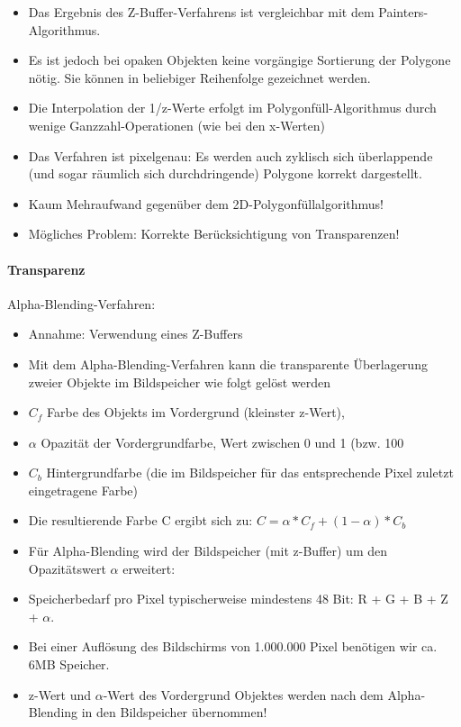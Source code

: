\documentclass[10pt,landscape]{article}
\begin{document}
\begin{multicols}{3}
{  %
  
  \begin{itemize}
    \item Das Ergebnis des Z-Buffer-Verfahrens ist vergleichbar mit dem Painters-Algorithmus.
    \item Es ist jedoch bei opaken Objekten keine vorgängige Sortierung der Polygone nötig. Sie können in beliebiger Reihenfolge gezeichnet werden.
    \item Die Interpolation der 1/z-Werte erfolgt im Polygonfüll-Algorithmus durch wenige Ganzzahl-Operationen (wie bei den x-Werten)
    \item Das Verfahren ist pixelgenau: Es werden auch zyklisch sich überlappende (und sogar räumlich sich durchdringende) Polygone korrekt dargestellt.
    \item Kaum Mehraufwand gegenüber dem 2D-Polygonfüllalgorithmus!
    \item Mögliches Problem: Korrekte Berücksichtigung von Transparenzen!
  \end{itemize}
  
  \paragraph{Transparenz}
  Alpha-Blending-Verfahren: 
  \begin{itemize}
    \item Annahme: Verwendung eines Z-Buffers
    \item Mit dem Alpha-Blending-Verfahren kann die transparente Überlagerung zweier Objekte im Bildspeicher wie folgt gelöst werden
    \item $C_f$ Farbe des Objekts im Vordergrund (kleinster z-Wert),
    \item $\alpha$ Opazität der Vordergrundfarbe, Wert zwischen 0 und 1 (bzw. 100%
    \item $C_b$ Hintergrundfarbe (die im Bildspeicher für das entsprechende Pixel zuletzt eingetragene Farbe)
    \item Die resultierende Farbe C ergibt sich zu: $C=\alpha*C_f+(1-\alpha)*C_b$
    \item Für Alpha-Blending wird der Bildspeicher (mit z-Buffer) um den Opazitätswert $\alpha$ erweitert:
    \item Speicherbedarf pro Pixel typischerweise mindestens 48 Bit: R + G + B + Z + $\alpha$.
    \item Bei einer Auflösung des Bildschirms von 1.000.000 Pixel benötigen wir ca. 6MB Speicher.
    \item z-Wert und $\alpha$-Wert des Vordergrund Objektes werden nach dem Alpha-Blending in den Bildspeicher übernommen!
  \end{itemize}
  
}
\end{multicols}
\end{document}
